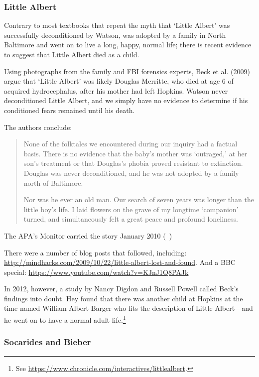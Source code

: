 \begin{refsection}
\subsubsection{Little Albert}
\label{littlealbert}

Contrary to most textbooks that repeat the myth that `Little Albert' was successfully deconditioned by Watson, was adopted by a family in North Baltimore and went on to live a long, happy, normal life; there is recent evidence to suggest that Little Albert died as a child. 

Using photographs from the family and FBI forensics experts, Beck et al. (2009) argue that `Little Albert' was likely Douglas Merritte, who died at age 6 of acquired hydrocephalus, after his mother had left Hopkins. Watson never deconditioned Little Albert, and we simply have no evidence to determine if his conditioned fears remained until his death. ~\citep{Beck:wk}

The authors conclude:

\begin{quote}

None of the folktales we encountered during our inquiry had a factual basis. There is no evidence that the baby's mother was `outraged‚' at her son's treatment or that Douglas's phobia proved resistant to extinction. Douglas was never deconditioned, and he was not adopted by a family north of Baltimore.

Nor was he ever an old man. Our search of seven years was longer than the little boy's life. I laid flowers on the grave of my longtime `companion' turned, and simultaneously felt a great peace and profound loneliness. ~\citep{Beck:wk}
\end{quote}

The APA's Monitor carried the story January 2010 (~\citep{LittleAlbertrega:2010ig})

There were a number of blog posts that followed, including: \url{http://mindhacks.com/2009/10/22/little-albert-lost-and-found}. And a BBC special: \url{https://www.youtube.com/watch?v=KJnJ1Q8PAJk}

In 2012, however, a study by Nancy Digdon and Russell Powell called Beck’s findings into doubt. Hey found that there was another child at Hopkins at the time named William Albert Barger who fits the description of Little Albert---and he went on to have a normal adult life.\footnote{See \url{https://www.chronicle.com/interactives/littlealbert}.} ~\citep{Powell:vw}

\subsubsection{Socarides and Bieber}
\label{socaridesandbieber}


\end{refsection}
